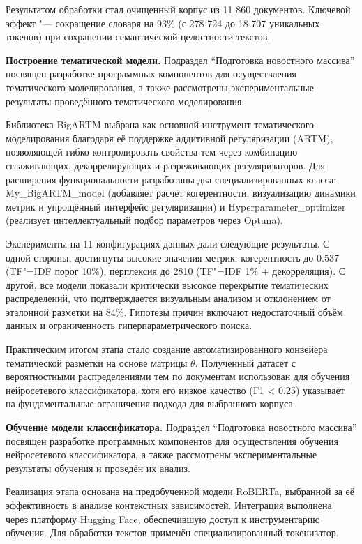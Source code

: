 \documentclass[autoref]{SCWorks}
\begin{document}
Результатом обработки стал очищенный корпус из 11 860 документов. Ключевой
эффект "--- сокращение словаря на 93\% (с 278 724 до 18 707 уникальных токенов)
при сохранении семантической целостности текстов.

\textbf{Построение тематической модели.}
Подраздел \enquote{Подготовка новостного массива} посвящен разработке
программных компонентов для осуществления тематического моделирования, а также
рассмотрены экспериментальные результаты проведённого тематического
моделирования. 

Библиотека BigARTM выбрана как основной инструмент тематического
моделирования благодаря её поддержке аддитивной регуляризации (ARTM),
позволяющей гибко контролировать свойства тем через комбинацию сглаживающих,
декоррелирующих и разреживающих регуляризаторов. Для расширения функциональности разработаны два
специализированных класса: My\_BigARTM\_model (добавляет расчёт когерентности,
визуализацию динамики метрик и упрощённый интерфейс регуляризации) и
Hyperparameter\_optimizer (реализует интеллектуальный подбор параметров через
Optuna).

Эксперименты на 11 конфигурациях данных дали следующие результаты. С
одной стороны, достигнуты высокие значения метрик: когерентность до 0.537
(TF"=IDF порог 10\%), перплексия до 2810 (TF"=IDF 1\% + декорреляция). С другой,
все модели показали критически высокое перекрытие тематических распределений,
что подтверждается визуальным анализом и отклонением от эталонной разметки на
84\%. Гипотезы причин включают недостаточный объём данных и ограниченность
гиперпараметрического поиска.

Практическим итогом этапа стало создание автоматизированного конвейера
тематической разметки на основе матрицы $\theta$. Полученный датасет с
вероятностными распределениями тем по документам использован для обучения
нейросетевого классификатора, хотя его низкое качество (F1 < 0.25) указывает на
фундаментальные ограничения подхода для выбранного корпуса.

\textbf{Обучение модели классификатора.}
Подраздел \enquote{Подготовка новостного массива} посвящен разработке
программных компонентов для осуществления обучения нейросетевого классификатора,
а также рассмотрены экспериментальные результаты обучения и проведён их анализ.

Реализация этапа основана на предобученной модели RoBERTa, выбранной за её
эффективность в анализе контекстных зависимостей. Интеграция выполнена через
платформу Hugging Face, обеспечившую доступ к инструментарию обучения. Для
обработки текстов применён специализированный токенизатор.
\end{document}
